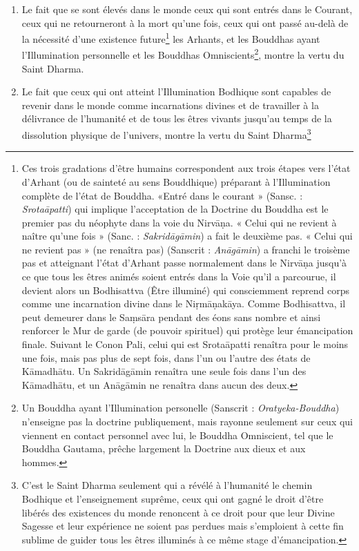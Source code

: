 \documentclass[10pt]{book}
\begin{document}
\begin{enumerate}[1.-]
\item Le fait que se sont élevés dans le monde ceux qui sont entrés dans le Courant, ceux qui ne retourneront à la mort qu'une fois, ceux qui ont passé au-delà de la nécessité d'une existence future\footnote{Ces trois gradations d'être humains correspondent aux trois étapes vers l'état d'Arhant (ou de sainteté au sens Bouddhique) préparant à l'Illumination complète de l'état de Bouddha. «Entré dans le courant » (Sansc. : \textit{Srotaāpatti}) qui implique l'acceptation de la Doctrine du Bouddha est le premier pas du néophyte dans la voie du  Nirvāṇa. « Celui qui ne revient à naître qu'une fois » (Sanc. : \textit{Sakridāgāmin}) a fait le deuxième pas. « Celui qui ne revient pas » (ne renaîtra pas) (Sanscrit : \textit{Anāgāmin}) a franchi le troisème pas et atteignant l'état d'Arhant passe normalement dans le Nirvāṇa jusqu'à ce que tous les êtres animés soient entrés dans la Voie qu'il a parcourue, il devient alors un Bodhisattva (Être illuminé) qui consciemment reprend corps comme une incarnation divine dans le Niṛmāṇakāya. Comme Bodhisattva, il peut demeurer dans le Saṃsāra pendant des éons sans nombre et ainsi renforcer le Mur de garde (de pouvoir spirituel) qui protège leur émancipation finale. Suivant le Conon Pali, celui qui est Srotaāpatti renaîtra pour le moins une fois, mais pas plus de sept fois, dans l'un ou l'autre des états de Kāmadhātu. Un Sakridāgāmin renaîtra une seule fois dans l'un des Kāmadhātu, et un Anāgāmin ne renaîtra dans aucun des deux.} les Arhants, et les Bouddhas ayant l'Illumination personnelle et les Bouddhas Omniscients\footnote{Un Bouddha ayant l'Illumination personelle (Sanscrit : \textit{Oratyeka-Bouddha}) n'enseigne pas la doctrine publiquement, mais rayonne seulement sur ceux qui viennent en contact personnel avec lui, le Bouddha Omniscient, tel que le Bouddha Gautama, prêche largement la Doctrine aux dieux et aux hommes.}, montre la vertu du Saint Dharma.
\item Le fait que ceux qui ont atteint l'Illumination Bodhique sont capables de revenir dans le monde comme incarnations divines et de travailler à la délivrance de l'humanité et de tous les êtres vivants jusqu'au temps de la dissolution physique de l'univers, montre la vertu du Saint Dharma\footnote{C'est le Saint Dharma seulement qui a révélé à l'humanité le chemin Bodhique et l'enseignement suprême, ceux qui ont gagné le droit d'être libérés des existences du monde renoncent à ce droit pour que leur Divine Sagesse et leur expérience ne soient pas perdues mais s'emploient à cette fin sublime de guider tous les êtres illuminés à ce même stage d'émancipation.}

\end{enumerate}
\end{document}
